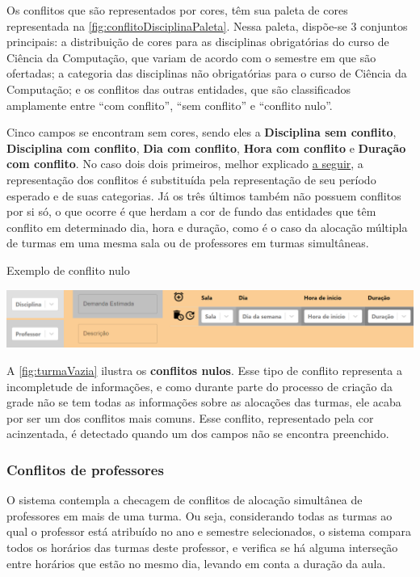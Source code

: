 Os conflitos que são representados por cores, têm sua paleta de cores representada na \autoref{fig:conflitoDisciplinaPaleta}. Nessa paleta, dispõe-se 3 conjuntos principais: a distribuição de cores para as disciplinas obrigatórias do curso de Ciência da Computação, que variam de acordo com o semestre em que são ofertadas; a categoria das disciplinas não obrigatórias para o curso de Ciência da Computação; e os conflitos das outras entidades, que são classificados amplamente entre ``com conflito'', ``sem conflito'' e ``conflito nulo''.

Cinco campos se encontram sem cores, sendo eles a \textbf{Disciplina sem conflito}, \textbf{Disciplina com conflito}, \textbf{Dia com conflito}, \textbf{Hora com conflito} e \textbf{Duração com conflito}. No caso dois dois primeiros, melhor explicado \hyperref[sssec:Disciplina]{a seguir}, a representação dos conflitos é substituída pela representação de seu período esperado e de suas categorias. Já os três últimos também não possuem conflitos por si só, o que ocorre é que herdam a cor de fundo das entidades que têm conflito em determinado dia, hora e duração, como é o caso da alocação múltipla de turmas em uma mesma sala ou de professores em turmas simultâneas.

\begin{MyCenteredFigure} \caption{Exemplo de conflito nulo} \label{fig:turmaVazia}
  \includegraphics[width=\textwidth]{files/img/2.02!5-desenvolvimento/2.02!5.1.5-conflitos/Incompletude de informações}
\end{MyCenteredFigure}

A \autoref{fig:turmaVazia} ilustra os \textbf{conflitos nulos}. Esse tipo de conflito representa a incompletude de informações, e como durante parte do processo de criação da grade não se tem todas as informações sobre as alocações das turmas, ele acaba por ser um dos conflitos mais comuns. Esse conflito, representado pela cor acinzentada, é detectado quando um dos campos não se encontra preenchido.

\subsubsection*{Conflitos de professores} \label{sssec:Professores}

O sistema contempla a checagem de conflitos de alocação simultânea de professores em mais de uma turma. Ou seja, considerando todas as turmas ao qual o professor está atribuído no ano e semestre selecionados, o sistema compara todos os horários das turmas deste professor, e verifica se há alguma interseção entre horários que estão no mesmo dia, levando em conta a duração da aula.

